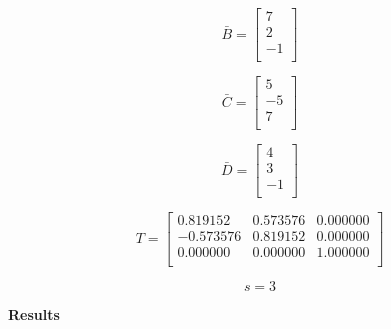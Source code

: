 \begin{equation}\nonumber
\bar{B} = \left[
\begin{array}{r}
  7 \\
  2 \\
 -1 \\
\end{array}\right]
\end{equation}

\begin{equation}\nonumber
\bar{C} = \left[
\begin{array}{r}
  5 \\
 -5 \\
  7 \\
\end{array}\right]
\end{equation}

\begin{equation}\nonumber
\bar{D} = \left[
\begin{array}{r}
  4 \\
  3 \\
 -1 \\
\end{array}\right]
\end{equation}

\begin{equation}\nonumber
T = \left[
\begin{array}{rrr}
  0.819152 & 0.573576 & 0.000000 \\
 -0.573576 & 0.819152 & 0.000000 \\
  0.000000 & 0.000000 & 1.000000 \\
\end{array}\right]
\end{equation}

\begin{equation}\nonumber
s =3
\end{equation}


{\bf Results}


